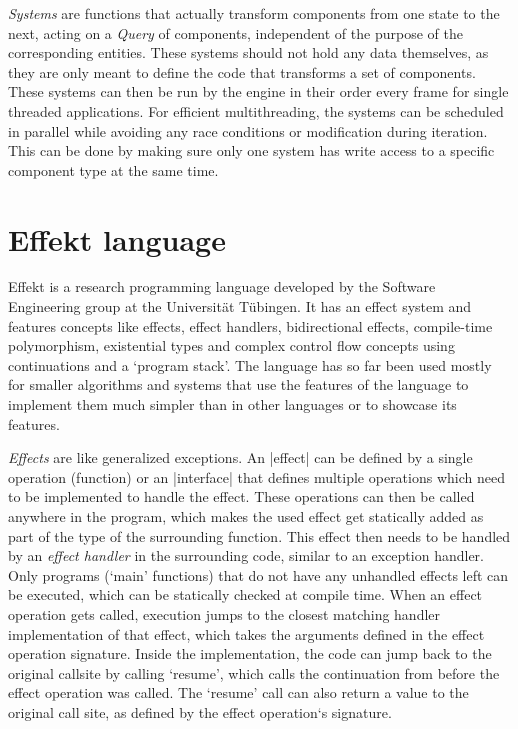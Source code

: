 \textit{Systems} are functions that actually transform components from one state to the next, acting on a \textit{Query} of components, independent of the purpose of the corresponding entities. These systems should not hold any data themselves, as they are only meant to define the code that transforms a set of components. These systems can then be run by the engine in their order every frame for single threaded applications. For efficient multithreading, the systems can be scheduled in parallel while avoiding any race conditions or modification during iteration. This can be done by making sure only one system has write access to a specific component type at the same time.

\section*{Effekt language}

Effekt is a research programming language developed by the Software Engineering group at the Universität Tübingen. It has an effect system and features concepts like effects, effect handlers, bidirectional effects, compile-time polymorphism, existential types and complex control flow concepts using continuations and a `program stack'. The language has so far been used mostly for smaller algorithms and systems that use the features of the language to implement them much simpler than in other languages or to showcase its features.

\textit{Effects} are like generalized exceptions. An |effect| can be defined by a single operation (function) or an |interface| that defines multiple operations which need to be implemented to handle the effect. These operations can then be called anywhere in the program, which makes the used effect get statically added as part of the type of the surrounding function. This effect then needs to be handled by an \textit{effect handler} in the surrounding code, similar to an exception handler. Only programs (`main' functions) that do not have any unhandled effects left can be executed, which can be statically checked at compile time. When an effect operation gets called, execution jumps to the closest matching handler implementation of that effect, which takes the arguments defined in the effect operation signature. Inside the implementation, the code can jump back to the original callsite by calling `resume', which calls the continuation from before the effect operation was called. The `resume' call can also return a value to the original call site, as defined by the effect operation`s signature.

